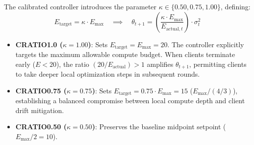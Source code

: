 \documentclass[10pt,a4paper]{article}
\begin{document}
The calibrated controller introduces the parameter $\kappa \in \{0.50, 0.75, 1.00\}$, defining:
\begin{equation}
E_{\text{target}} = \kappa \cdot E_{\max} \quad \implies \quad \theta_{t+1} = \left( \frac{\kappa \cdot E_{\max}}{E_{\text{actual}, t}} \right) \cdot \sigma^2_t
\label{eq:calib_controller}
\end{equation}
\begin{itemize}
    \item \textbf{CRATIO1.0 ($\kappa = 1.00$)}: Sets $E_{\text{target}} = E_{\max} = 20$. The controller explicitly targets the maximum allowable compute budget. When clients terminate early ($E < 20$), the ratio $(20 / E_{\text{actual}}) > 1$ amplifies $\theta_{t+1}$, permitting clients to take deeper local optimization steps in subsequent rounds.
    \item \textbf{CRATIO0.75 ($\kappa = 0.75$)}: Sets $E_{\text{target}} = 0.75 \cdot E_{\max} = 15$ ($E_{\max} / (4/3)$), establishing a balanced compromise between local compute depth and client drift mitigation.
    \item \textbf{CRATIO0.50 ($\kappa = 0.50$)}: Preserves the baseline midpoint setpoint ($E_{\max} / 2 = 10$).
\end{itemize}
\end{document}

